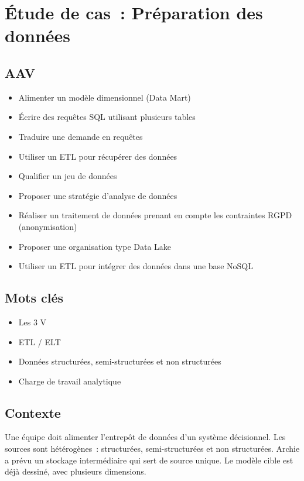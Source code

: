 \newpage
\section*{Étude de cas~: Préparation des données}
{}

\subsection*{AAV}
{}
\begin{itemize}
	\item [3] Alimenter un modèle dimensionnel (Data Mart)
	\item [3] Écrire des requêtes SQL utilisant plusieurs tables
	\item [3] Traduire une demande en requêtes
	\item [3] Utiliser un ETL pour récupérer des données
	\item [4] Qualifier un jeu de données
	\item [4] Proposer une stratégie d'analyse de données
	\item [3] Réaliser un traitement de données prenant en compte les contraintes RGPD (anonymisation)
	\item [3] Proposer une organisation type Data Lake
	\item [3] Utiliser un ETL pour intégrer des données dans une base NoSQL
\end{itemize}

\subsection*{Mots clés}
{}
\begin{itemize}
	\item Les 3 V
	\item ETL / ELT
	\item Données structurées, semi-structurées et non structurées
	\item Charge de travail analytique
\end{itemize}

\subsection*{Contexte}
{}
\noindent Une équipe doit alimenter l'entrepôt de données d'un système décisionnel. Les sources sont hétérogènes~: structurées, semi-structurées et non structurées. Archie a prévu un stockage intermédiaire qui sert de source unique. Le modèle cible est déjà dessiné, avec plusieurs dimensions.

